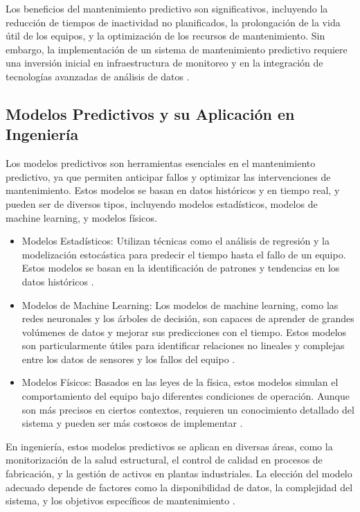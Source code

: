 Los beneficios del mantenimiento predictivo son significativos, incluyendo la reducción de tiempos de inactividad no planificados, la prolongación de la vida útil de los equipos, y la optimización de los recursos de mantenimiento. Sin embargo, la implementación de un sistema de mantenimiento predictivo requiere una inversión inicial en infraestructura de monitoreo y en la integración de tecnologías avanzadas de análisis de datos \cite{mobley2002predictive}.

\subsection{Modelos Predictivos y su Aplicación en Ingeniería}

Los modelos predictivos son herramientas esenciales en el mantenimiento predictivo, ya que permiten anticipar fallos y optimizar las intervenciones de mantenimiento. Estos modelos se basan en datos históricos y en tiempo real, y pueden ser de diversos tipos, incluyendo modelos estadísticos, modelos de machine learning, y modelos físicos.

\begin{itemize}
    \item Modelos Estadísticos: Utilizan técnicas como el análisis de regresión y la modelización estocástica para predecir el tiempo hasta el fallo de un equipo. Estos modelos se basan en la identificación de patrones y tendencias en los datos históricos \cite{jardine2006machine}.
    
    \item Modelos de Machine Learning: Los modelos de machine learning, como las redes neuronales y los árboles de decisión, son capaces de aprender de grandes volúmenes de datos y mejorar sus predicciones con el tiempo. Estos modelos son particularmente útiles para identificar relaciones no lineales y complejas entre los datos de sensores y los fallos del equipo \cite{zhang2019machine}.
    
    \item Modelos Físicos: Basados en las leyes de la física, estos modelos simulan el comportamiento del equipo bajo diferentes condiciones de operación. Aunque son más precisos en ciertos contextos, requieren un conocimiento detallado del sistema y pueden ser más costosos de implementar \cite{marquez2012models}.
\end{itemize}

En ingeniería, estos modelos predictivos se aplican en diversas áreas, como la monitorización de la salud estructural, el control de calidad en procesos de fabricación, y la gestión de activos en plantas industriales. La elección del modelo adecuado depende de factores como la disponibilidad de datos, la complejidad del sistema, y los objetivos específicos de mantenimiento \cite{lee2014predictive}.

